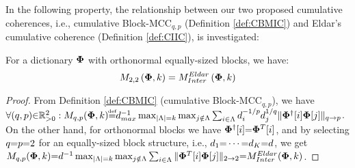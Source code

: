 In the following property, the relationship between our two proposed cumulative coherences, i.e., cumulative Block-MCC$_{q,p}$ (Definition \ref{def:CBMIC}) and Eldar's cumulative coherence (Definition \ref{def:CIIC}), is investigated:
\begin{property}
\label{prp:BMIC-CIIC} 
For a dictionary $\boldsymbol{\Phi}$ with orthonormal equally-sized blocks, we have:
\begin{equation*}
M_{2,2}\left( \boldsymbol{\Phi},k \right) = M_{Inter}^{Eldar}\left( \boldsymbol{\Phi} , k \right)
\end{equation*}
\end{property}
\begin{proof}
From Definition \ref{def:CBMIC} (cumulative Block-MCC$_{q,p}$), we have $\forall (q , p) \ssin \mathbb{R}^2_{\sg 0} : M_{q,p} (\myPhi , k) {\myeq} d_{max}^{-1} \max_{\vert \Lambda \vert =k} \max_{j \notin \Lambda} \sum_{i \in \Lambda} d_{i}^{-1/p} d_{j}^{1/q} \Vert \myPhi^\dagger [i] \myPhi [j] \Vert_{q \to p}$.
On the other hand, for orthonormal blocks we have $\boldsymbol{\Phi}^\dagger [i] {=} \boldsymbol{\Phi}^T [i]$, and by selecting $q {=} p{=} 2$ for an equally-sized block structure, i.e., $d_1 {=} \cdots {=} d_K {=} d$, we get $M_{q,p} (\boldsymbol{\Phi} , k) {=} d^{-1} \max_{\vert \Lambda \vert =k} \max_{j \notin \Lambda} \sum_{i \in \Lambda} \Vert \boldsymbol{\Phi}^T [i] \boldsymbol{\Phi} [j] \Vert_{2 \to 2} {=} M_{Inter}^{Eldar} (\boldsymbol{\Phi} , k)$. %
\end{proof}